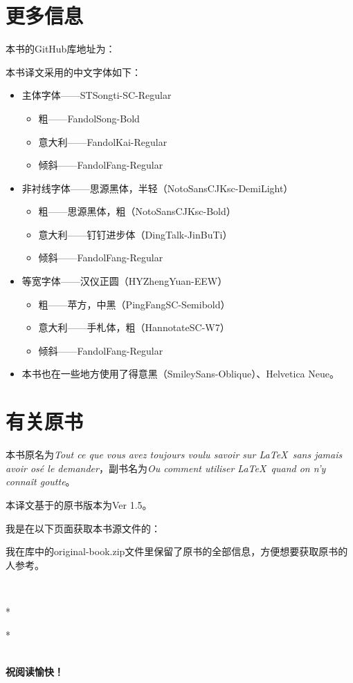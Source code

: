 \section*{更多信息}

本书的GitHub库地址为：

\begin{center}
\end{center}

本书译文采用的中文字体如下：

\begin{itemize}
    \item 主体字体——STSongti-SC-Regular
    \begin{itemize}
        \item 粗——FandolSong-Bold
        \item 意大利——FandolKai-Regular
        \item 倾斜——FandolFang-Regular
    \end{itemize}
    \item 非衬线字体——思源黑体，半轻（NotoSansCJKsc-DemiLight）
    \begin{itemize}
        \item 粗——思源黑体，粗（NotoSansCJKsc-Bold）
        \item 意大利——钉钉进步体（DingTalk-JinBuTi）
        \item 倾斜——FandolFang-Regular
    \end{itemize}
    \item 等宽字体——汉仪正圆（HYZhengYuan-EEW）
    \begin{itemize}
        \item 粗——苹方，中黑（PingFangSC-Semibold）
        \item 意大利——手札体，粗（HannotateSC-W7）
        \item 倾斜——FandolFang-Regular
    \end{itemize}
    \item 本书也在一些地方使用了得意黑（SmileySans-Oblique）、Helvetica Neue。
\end{itemize}

\section*{有关原书}

本书原名为\emph{Tout ce que vous avez toujours voulu savoir sur \LaTeX \ sans jamais avoir osé le demander}，副书名为\emph{Ou comment utiliser \LaTeX \ quand on n'y connaît goutte}。

本译文基于的原书版本为Ver 1.5。

我是在以下页面获取本书源文件的：

\begin{center}
\end{center}

我在库中的original-book.zip文件里保留了原书的全部信息，方便想要获取原书的人参考。

~\\

\begin{center}
    *

    *\quad *

    ~\\

    \textbf{祝阅读愉快！}
\end{center}
